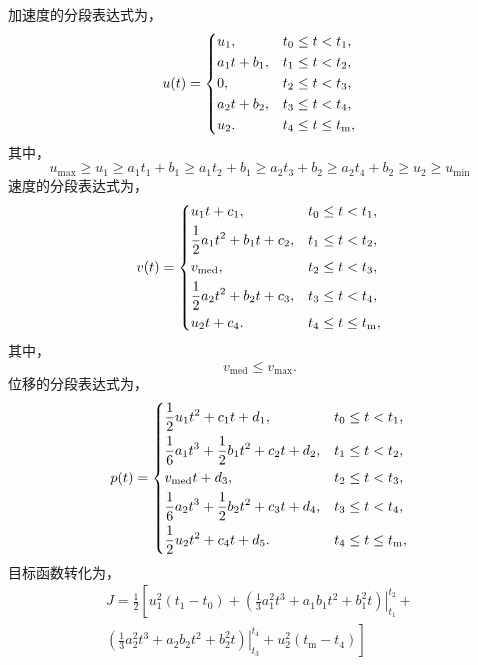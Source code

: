 加速度的分段表达式为，
\begin{equation}
u(t)=
\begin{dcases}
u_1,\quad & t_0\leq t<t_1,\\
a_1t+b_1, & t_1\leq t<t_2,\\
0, & t_2\leq t<t_3,\\
a_2t+b_2,& t_3\leq t<t_4,\\
u_2. & t_4\leq t\leq t_\mathrm{m},\\
\end{dcases}
\end{equation}
其中，
\begin{equation}
u_{\max}\geq u_1\geq a_1t_1+b_1\geq a_1t_2+b_1\geq a_2t_3+b_2\geq a_2t_4+b_2\geq u_2\geq u_{\min}
\label{eq:num:aac}
\end{equation}
速度的分段表达式为，
\begin{equation}
v(t)=
\begin{dcases}
u_1t+c_1,\quad & t_0\leq t<t_1,\\
\frac12a_1t^2+b_1t+c_2, & t_1\leq t<t_2,\\
v_\mathrm{med}, & t_2\leq t<t_3,\\
\frac12a_2t^2+b_2t+c_3,& t_3\leq t<t_4,\\
u_2t+c_4. & t_4\leq t\leq t_\mathrm{m},\\
\end{dcases}
\end{equation}
其中，
\begin{equation}
v_\mathrm{med}\leq v_{\max}.
\label{eq:num:vvc}
\end{equation}
位移的分段表达式为，
\begin{equation}
p(t)=
\begin{dcases}
\frac12u_1t^2+c_1t+d_1,\quad & t_0\leq t<t_1,\\
\frac16a_1t^3+\frac12b_1t^2+c_2t+d_2, & t_1\leq t<t_2,\\
v_\mathrm{med}t+d_3, & t_2\leq t<t_3,\\
\frac16a_2t^3+\frac12b_2t^2+c_3t+d_4,& t_3\leq t<t_4,\\
\frac12u_2t^2+c_4t+d_5. & t_4\leq t\leq t_\mathrm{m},\\
\end{dcases}
\end{equation}
目标函数转化为，
\begin{equation}
\begin{split}
J=\frac12\left[u_1^2(t_1-t_0)+\left.\left(\frac13a_1^2t^3+a_1b_1t^2+b_1^2t\right)\right|_{t_1}^{t_2}+\right.\\
\left.\left.\left(\frac13a_2^2t^3+a_2b_2t^2+b_2^2t\right)\right|_{t_3}^{t_4}+u_2^2(t_\mathrm{m}-t_4)\right]
\end{split}
\label{eq:a_piece_obj}
\end{equation}
